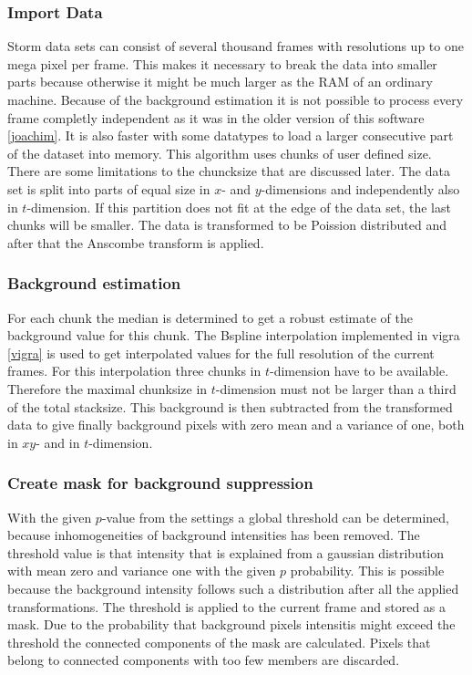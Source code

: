 \subsubsection{Import Data}
Storm data sets can consist of several thousand frames with resolutions up to one mega pixel per frame. This makes it necessary to break the data into smaller parts because otherwise it might be much larger as the RAM of an ordinary machine. Because of the background estimation it is not possible to process every frame completly independent as it was in the older version of this software \ref{joachim}. It is also faster with some datatypes to load a larger consecutive part of the dataset into memory.\newline
This algorithm uses chunks of user defined size. There are some limitations to the chuncksize that are discussed later. The data set is split into parts of equal size in $x$- and $y$-dimensions and independently also in $t$-dimension. If this partition does not fit at the edge of the data set, the last chunks will be smaller.\newline
The data is transformed to be Poission distributed and after that the Anscombe transform is applied.
\subsubsection{Background estimation}
For each chunk the median is determined to get a robust estimate of the background value for this chunk. 
The Bspline interpolation implemented in vigra \ref{vigra} is used to get interpolated values for the full resolution of the current frames. For this interpolation three chunks in $t$-dimension have to be available. Therefore the maximal chunksize in $t$-dimension must not be larger than a third of the total stacksize.\newline
This background is then subtracted from the transformed data to give finally background pixels with zero mean and a variance of one, both in $xy$- and in $t$-dimension.
\subsubsection{Create mask for background suppression}
With the given $p$-value from the settings a global threshold can be determined, because inhomogeneities of background intensities has been removed. The threshold value is that intensity that is explained from a gaussian distribution with mean zero and variance one with the given $p$ probability. This is possible because the background intensity follows such a distribution after all the applied transformations.\newline
The threshold is applied to the current frame and stored as a mask. Due to the probability that background pixels intensitis might exceed the threshold the connected components of the mask are calculated. Pixels that belong to connected components with too few members are discarded. 
